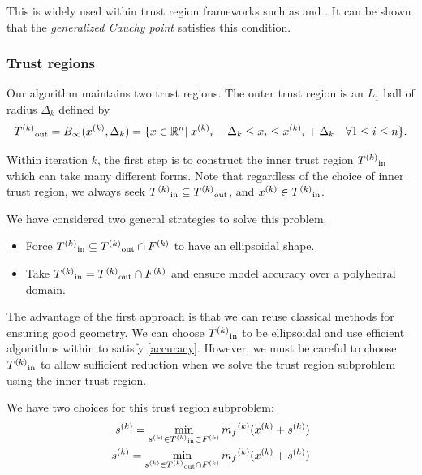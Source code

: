 This is widely used within trust region frameworks such as \cite{Conejo:2013:GCT:2620806.2621814} and \cite{Conn:2000:TM:357813}.
It can be shown that the \emph{generalized Cauchy point} satisfies this condition.


\subsubsection{Trust regions}
Our algorithm maintains two trust regions.
The outer trust region is an $L_1$ ball of radius $\Delta_k$ defined by
\begin{equation}
\label{trust_region}
{T^{(k)}}_{\text{out}} = B_{\infty}({x}^{(k)},\Delta_k) = \{x\in \mathbb R^n | \; {{x}^{(k)}}_i - \Delta_k \le x_i \le {{x}^{(k)}}_i + \Delta_k \quad \forall 1\le i \le n\}.
\end{equation}

Within iteration $k$, the first step is to construct the inner trust region ${T^{(k)}}_{\text{in}}$ which can take many different forms.
Note that regardless of the choice of inner trust region, we always seek
${T^{(k)}}_{\text{in}} \subseteq {T^{(k)}}_{\text{out}} $, and ${x}^{(k)} \in {T^{(k)}}_{\text{in}}$.


We have considered two general strategies to solve this problem.

\begin{itemize}
\item Force $\label{bluepill} {T^{(k)}}_{\text{in}} \subseteq {T^{(k)}}_{\text{out}} \cap {F}^{(k)}$ to have an ellipsoidal shape.
\item Take $\label{redpill} {T^{(k)}}_{\text{in}} = {T^{(k)}}_{\text{out}} \cap {F}^{(k)}$ and ensure model accuracy over a polyhedral domain.
\end{itemize}

The advantage of the first approach is that we can reuse classical methods for ensuring good geometry.
We can choose ${T^{(k)}}_{\text{in}}$ to be ellipsoidal and use efficient algorithms within \cite{DUMMY:intro_book} to satisfy \cref{accuracy}.
However, we must be careful to choose ${T^{(k)}}_{\text{in}}$ to allow sufficient reduction when we solve the trust region subproblem using the inner trust region.


We have two choices for this trust region subproblem:
\label{which_trust_region}
\begin{align}
{s}^{(k)} = \min_{{s}^{(k)} \in {T^{(k)}}_{\text{in}} \subset {F}^{(k)}} {{m}_f}^{(k)}({x}^{(k)} + {s}^{(k)}) \label{search_a_little} \\
{s}^{(k)} = \min_{{s}^{(k)} \in {T^{(k)}}_{\text{out}} \cap {F}^{(k)}} {{m}_f}^{(k)}({x}^{(k)} + {s}^{(k)}) \label{search_a_lot}
\end{align}

